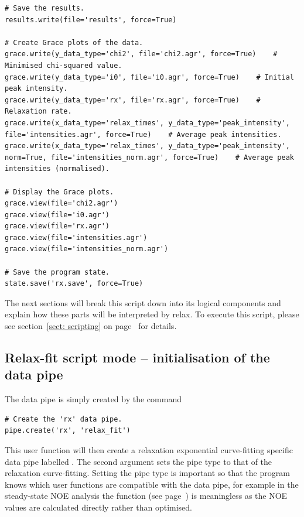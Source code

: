 \begin{lstlisting}
# Save the results.
results.write(file='results', force=True)

# Create Grace plots of the data.
grace.write(y_data_type='chi2', file='chi2.agr', force=True)    # Minimised chi-squared value.
grace.write(y_data_type='i0', file='i0.agr', force=True)    # Initial peak intensity.
grace.write(y_data_type='rx', file='rx.agr', force=True)    # Relaxation rate.
grace.write(x_data_type='relax_times', y_data_type='peak_intensity', file='intensities.agr', force=True)    # Average peak intensities.
grace.write(x_data_type='relax_times', y_data_type='peak_intensity', norm=True, file='intensities_norm.agr', force=True)    # Average peak intensities (normalised).

# Display the Grace plots.
grace.view(file='chi2.agr')
grace.view(file='i0.agr')
grace.view(file='rx.agr')
grace.view(file='intensities.agr')
grace.view(file='intensities_norm.agr')

# Save the program state.
state.save('rx.save', force=True)
\end{lstlisting}

The next sections will break this script down into its logical components and explain how these parts will be interpreted by relax.
To execute this script, please see section~\ref{sect: scripting} on page~\pageref{sect: scripting} for details.



\subsection{Relax-fit script mode -- initialisation of the data pipe} \label{Rx initialisation}

The data pipe is simply created by the command

\begin{lstlisting}[firstnumber=3]
# Create the 'rx' data pipe.
pipe.create('rx', 'relax_fit')
\end{lstlisting}

This user function will then create a relaxation exponential curve-fitting specific data pipe labelled .
The second argument sets the pipe type to that of the relaxation curve-fitting.
Setting the pipe type is important so that the program knows which user functions are compatible with the data pipe, for example in the steady-state NOE analysis the function  (see page~\pageref{uf: minimise.execute}) is meaningless as the NOE values are calculated directly rather than optimised.


